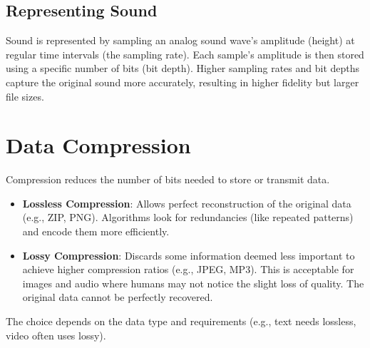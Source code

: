 \documentclass[11pt,oneside]{book}
\begin{document}
\subsection*{Representing Sound}
Sound is represented by sampling an analog sound wave's amplitude (height) at regular time intervals (the sampling rate). Each sample's amplitude is then stored using a specific number of bits (bit depth). Higher sampling rates and bit depths capture the original sound more accurately, resulting in higher fidelity but larger file sizes.

\section{Data Compression}
\label{sec:data_compression}
Compression reduces the number of bits needed to store or transmit data.
\begin{itemize}
    \item \textbf{Lossless Compression}: Allows perfect reconstruction of the original data (e.g., ZIP, PNG). Algorithms look for redundancies (like repeated patterns) and encode them more efficiently.
    \item \textbf{Lossy Compression}: Discards some information deemed less important to achieve higher compression ratios (e.g., JPEG, MP3). This is acceptable for images and audio where humans may not notice the slight loss of quality. The original data cannot be perfectly recovered.
\end{itemize}
The choice depends on the data type and requirements (e.g., text needs lossless, video often uses lossy).
\end{document}
